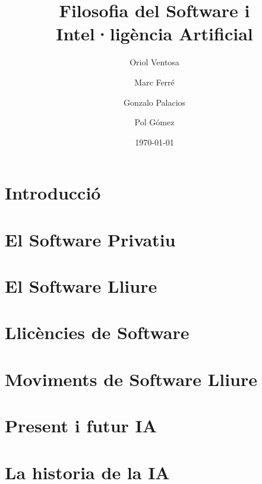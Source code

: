 \documentclass[a4paper,12pt]{report}
\begin{document}
\title{
	{\bf Filosofia del Software i Intel·ligència Artificial}
}
\author{
	Oriol Ventosa \and
	Marc Ferré \and
	Gonzalo Palacios \and
	Pol Gómez
}
\date{\today}
\maketitle

\tableofcontents

\chapter{Introducció}


\chapter{El Software Privatiu}


\chapter{El Software Lliure}


\chapter{Llicències de Software}


\chapter{Moviments de Software Lliure}


\chapter{Present i futur IA}


\chapter{La historia de la IA}




\end{document}
